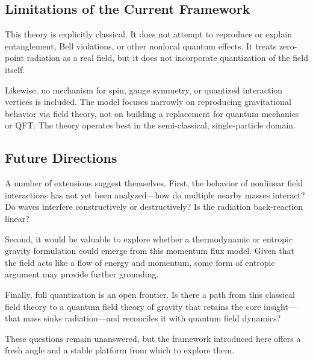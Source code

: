 \documentclass {article}
\begin{document}
\subsection{Limitations of the Current Framework}

This theory is explicitly classical. It does not attempt to reproduce or explain entanglement, Bell violations, or other nonlocal quantum effects. It treats zero-point radiation as a real field, but it does not incorporate quantization of the field itself.

Likewise, no mechanism for spin, gauge symmetry, or quantized interaction vertices is included. The model focuses narrowly on reproducing gravitational behavior via field theory, not on building a replacement for quantum mechanics or QFT. The theory operates best in the semi-classical, single-particle domain.

\subsection{Future Directions}

A number of extensions suggest themselves. First, the behavior of nonlinear field interactions has not yet been analyzed—how do multiple nearby masses interact? Do waves interfere constructively or destructively? Is the radiation back-reaction linear?

Second, it would be valuable to explore whether a thermodynamic or entropic gravity formulation could emerge from this momentum flux model. Given that the field acts like a flow of energy and momentum, some form of entropic argument may provide further grounding.

Finally, full quantization is an open frontier. Is there a path from this classical field theory to a quantum field theory of gravity that retains the core insight—that mass sinks radiation—and reconciles it with quantum field dynamics?

These questions remain unanswered, but the framework introduced here offers a fresh angle and a stable platform from which to explore them.

\newpage
\end{document}
